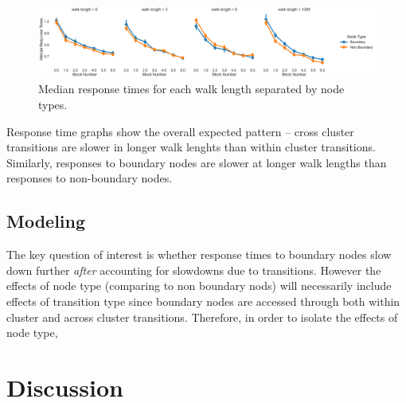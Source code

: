 \begin{figure}
	\centering
	\label{fig:rt-walklength-nodes}
	\includegraphics[width = \textwidth]{chapter_notebooks/chapter_2/figures/median_rts_nodetype.png}
	\caption{Median response times for each walk length separated by node types.}
\end{figure}

Response time graphs show the overall expected pattern -- cross cluster transitions are slower in longer walk lenghts than within cluster transitions. Similarly, responses to boundary nodes are slower at longer walk lengths than responses to non-boundary nodes. 

\subsection*{Modeling}
The key question of interest is whether response times to boundary nodes slow down further \textit{after} accounting for slowdowns due to transitions. However the effects of node type (comparing to non boundary nods) will necessarily include effects of transition type since boundary nodes are accessed through both within cluster and across cluster transitions. Therefore, in order to isolate the effects of node type,  


\section{Discussion}




